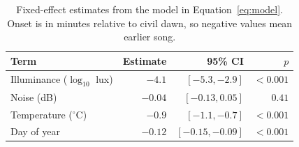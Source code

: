 \begin{table}[t]
  \centering
  \caption{Fixed-effect estimates from the model in Equation~\ref{eq:model}. Onset is in minutes relative to civil dawn, so negative values mean earlier song.}
  \label{tab:estimates}
  \begin{tabular}{lrrr}
    \toprule
    Term & Estimate & 95\% CI & $p$ \\
    \midrule
    Illuminance ($\log_{10}$ lux) & $-4.1$ & $[-5.3, -2.9]$ & $<0.001$ \\
    Noise (dB)                    & $-0.04$ & $[-0.13, 0.05]$ & $0.41$ \\
    Temperature ($^\circ$C)       & $-0.9$ & $[-1.1, -0.7]$ & $<0.001$ \\
    Day of year                   & $-0.12$ & $[-0.15, -0.09]$ & $<0.001$ \\
    \bottomrule
  \end{tabular}
\end{table}
